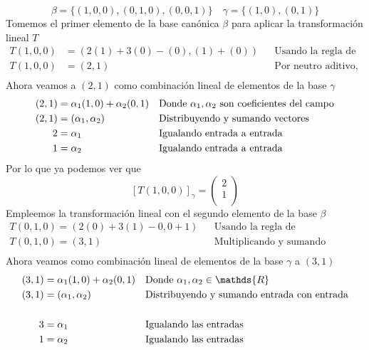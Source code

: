 \documentclass[letterpaper]{article}
\newcommand{\R}{\mathds{R}}
\renewcommand{\*}{\cdot}
\theoremstyle{definition}
\begin{document}
		 \[  \beta = \lbrace (1,0,0),(0,1,0),(0,0,1) \rbrace \quad \gamma = \lbrace (1,0),(0,1) \rbrace \]
		 Tomemos el primer elemento de la base canónica $ \beta $ para aplicar la transformación lineal $ T $ 
		 \begin{align*}
		 	T(1,0,0) &= (2(1) + 3(0) - (0), (1)+ (0)) && \text{Usando la regla de correspondencia}\\
		 	T(1,0,0) &= (2,1) && \text{Por neutro aditivo, neutro multiplicativo}\\
		 \end{align*}
		 Ahora veamos a $ (2,1) $ como combinación lineal de elementos de la base $ \gamma $
		 \begin{align*}
		 	(2,1) &= \alpha_1(1,0)+ \alpha_2(0,1) && \text{Donde $ \alpha_1,\alpha_2 $ son coeficientes del campo}\\
		 	(2,1) &= (\alpha_1,\alpha_2) && \text{Distribuyendo y sumando vectores}\\
		 	2 &= \alpha_1 && \text{Igualando entrada a entrada}\\
		 	1 &= \alpha_2 && \text{Igualando entrada a entrada}\\
		 \end{align*}
		 Por lo que ya podemos ver que 
		 \[ [T(1,0,0)]_{\gamma} = \begin{pmatrix}
		 2\\
		 1\\
		 \end{pmatrix} \]		
		Empleemos la transformación lineal con el segundo elemento de la base $ \beta $
		\begin{align*}
			T(0,1,0) = (2(0) +3(1) - 0, 0 + 1) && \text{Usando la regla de correspondencia de T}\\
			T(0,1,0) = (3,1) && \text{Multiplicando y sumando neutros aditivos}\\
		\end{align*}
		Ahora veamos como combinación lineal de elementos de la base $ \gamma $ a $ (3,1) $		
		\begin{align*}
			(3,1) &= \alpha_1(1,0) + \alpha_2(0,1) && \text{Donde $ \alpha_1, \alpha_2 \in \R$}\\
			(3,1) &= (\alpha_1,\alpha_2) && \text{Distribuyendo y sumando entrada con entrada}\\
			\\
			3 &= \alpha_1 && \text{Igualando las entradas}\\
			1 &= \alpha_2 && \text{Igualando las entradas}\\
		\end{align*}
\end{document}
